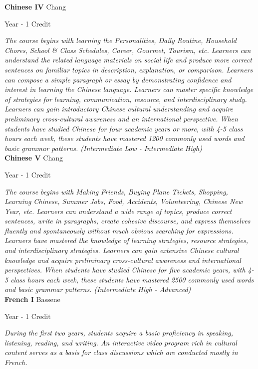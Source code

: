 \noindent\textbf{Chinese IV} \hfill Chang

\noindent Year - 1 Credit

\vspace{1mm}\emph{The course begins with learning the Personalities, Daily Routine, Household Chores, School & Class Schedules, Career, Gourmet, Tourism, etc. Learners can understand the related language materials on social life and produce more correct sentences on familiar topics in description, explanation, or comparison.  Learners can compose a simple paragraph or essay by demonstrating confidence and interest in learning the Chinese language.  Learners can master specific knowledge of strategies for learning, communication, resource, and interdisciplinary study.  Learners can gain introductory Chinese cultural understanding and acquire preliminary cross-cultural awareness and an international perspective. When students have studied Chinese for four academic years or more, with 4-5 class hours each week, these students have mastered 1200 commonly used words and basic grammar patterns.     (Intermediate Low - Intermediate High)}\\



\noindent\textbf{Chinese V} \hfill Chang

\noindent Year - 1 Credit

\vspace{1mm}\emph{	The course begins with Making Friends, Buying Plane Tickets, Shopping, Learning Chinese, Summer Jobs, Food, Accidents, Volunteering, Chinese New Year, etc. Learners can understand a wide range of topics, produce correct sentences, write in paragraphs, create cohesive discourse, and express themselves fluently and spontaneously without much obvious searching for expressions. Learners have mastered the knowledge of learning strategies, resource strategies, and interdisciplinary strategies. Learners can gain extensive Chinese cultural knowledge and acquire preliminary cross-cultural awareness and international perspectives. When students have studied Chinese for five academic years, with 4-5 class hours each week, these students have mastered 2500 commonly used words and basic grammar patterns. (Intermediate High - Advanced)}\\



\noindent\textbf{French I} \hfill Bassene

\noindent Year - 1 Credit

\vspace{1mm}\emph{During the first two years, students acquire a basic proficiency in speaking, listening, reading, and writing.  An interactive video program rich in cultural content serves as a basis for class discussions which are conducted mostly in French.}\\

